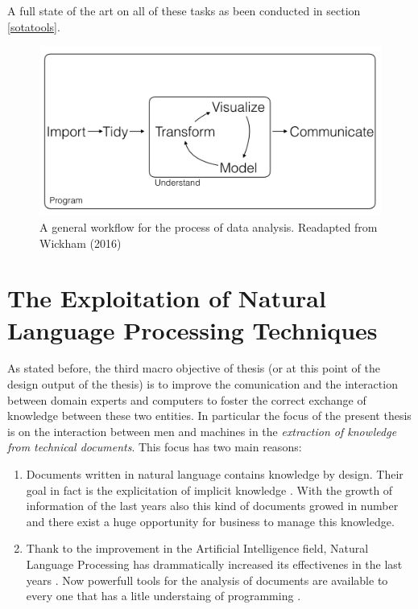 \documentclass[]{book}
\begin{document}
A full state of the art on all of these tasks as been conducted in
section \ref{sotatools}.

\begin{figure}

{\centering \includegraphics[width=0.8\linewidth]{_bookdown_files/figures/main_work_flow} 

}

\caption{A general workflow for the process of data analysis. Readapted from Wickham (2016)}\label{fig:mainworkflow}
\end{figure}

\section{The Exploitation of Natural Language Processing
Techniques}\label{the-exploitation-of-natural-language-processing-techniques}

As stated before, the third macro objective of thesis (or at this point
of the design output of the thesis) is to improve the comunication and
the interaction between domain experts and computers to foster the
correct exchange of knowledge between these two entities. In particular
the focus of the present thesis is on the interaction between men and
machines in the \emph{extraction of knowledge from technical documents}.
This focus has two main reasons:

\begin{enumerate}
\def\labelenumi{\arabic{enumi}.}
\item
  Documents written in natural language contains knowledge by design.
  Their goal in fact is the explicitation of implicit knowledge
  \citep[\citet{graesser1985structures}]{masters1992knowledge}. With the
  growth of information of the last years also this kind of documents
  growed in number and there exist a huge opportunity for business to
  manage this knowledge.
\item
  Thank to the improvement in the Artificial Intelligence field, Natural
  Language Processing has drammatically increased its effectivenes in
  the last years \citep{russell2016artificial}. Now powerfull tools for
  the analysis of documents are available to every one that has a litle
  understaing of programming \citep[\citet{Kenneth2018spacyr},
  \citet{Wijffels2018udpipe}]{Taylor2017Tidy}.
\end{enumerate}
\end{document}
